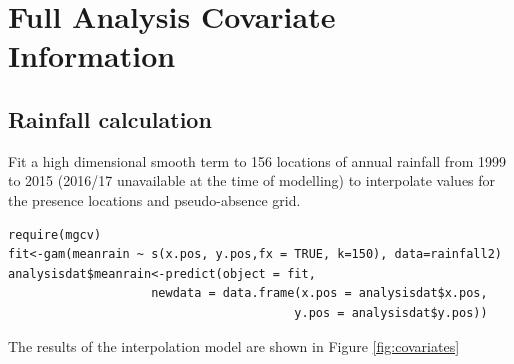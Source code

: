



\section{Full Analysis Covariate Information}

\subsection*{Rainfall calculation} 

Fit a high dimensional smooth term to 156 locations of annual rainfall from 1999 to 2015 (2016/17 unavailable at the time of modelling) to interpolate values for the presence locations and pseudo-absence grid.

\begin{verbatim}
require(mgcv)
fit<-gam(meanrain ~ s(x.pos, y.pos,fx = TRUE, k=150), data=rainfall2)
analysisdat$meanrain<-predict(object = fit, 
                    newdata = data.frame(x.pos = analysisdat$x.pos, 
                                        y.pos = analysisdat$y.pos))
\end{verbatim}

The results of the interpolation model are shown in Figure \ref{fig:covariates}

